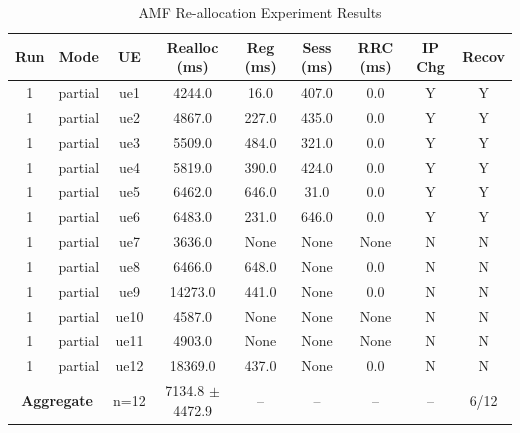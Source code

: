 \begin{table}[ht]
\centering
\begin{tabular}{|c|c|c|c|c|c|c|c|c|}
\hline
Run & Mode & UE & Realloc (ms) & Reg (ms) & Sess (ms) & RRC (ms) & IP Chg & Recov \\
\hline
1 & partial & ue1 & 4244.0 & 16.0 & 407.0 & 0.0 & Y & Y \\
1 & partial & ue2 & 4867.0 & 227.0 & 435.0 & 0.0 & Y & Y \\
1 & partial & ue3 & 5509.0 & 484.0 & 321.0 & 0.0 & Y & Y \\
1 & partial & ue4 & 5819.0 & 390.0 & 424.0 & 0.0 & Y & Y \\
1 & partial & ue5 & 6462.0 & 646.0 & 31.0 & 0.0 & Y & Y \\
1 & partial & ue6 & 6483.0 & 231.0 & 646.0 & 0.0 & Y & Y \\
1 & partial & ue7 & 3636.0 & None & None & None & N & N \\
1 & partial & ue8 & 6466.0 & 648.0 & None & 0.0 & N & N \\
1 & partial & ue9 & 14273.0 & 441.0 & None & 0.0 & N & N \\
1 & partial & ue10 & 4587.0 & None & None & None & N & N \\
1 & partial & ue11 & 4903.0 & None & None & None & N & N \\
1 & partial & ue12 & 18369.0 & 437.0 & None & 0.0 & N & N \\
\multicolumn{2}{|c|}{\textbf{Aggregate}} & n=12 & 7134.8 $\pm$ 4472.9 & -- & -- & -- & -- & 6/12 \\
\hline
\end{tabular}
\caption{AMF Re-allocation Experiment Results}
\label{tab:amf_realloc}
\end{table}
